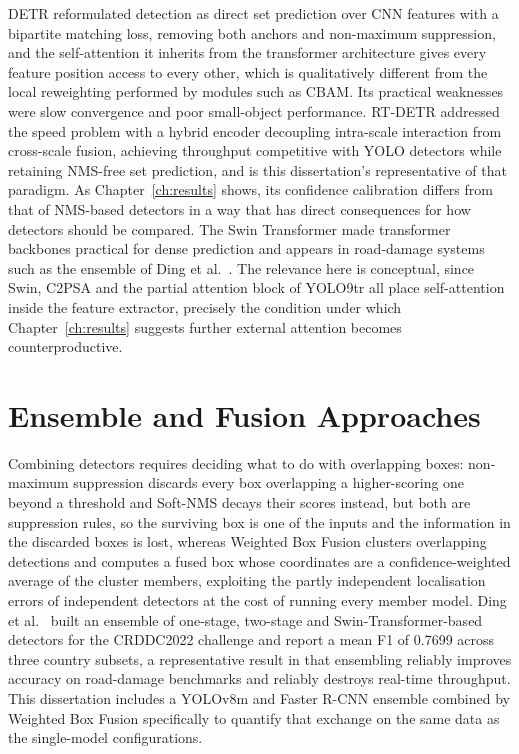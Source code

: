 \documentclass[MScCS]{uccthesis}
\begin{document}
DETR \parencite{carion2020detr} reformulated detection as direct set prediction
over CNN features with a bipartite matching loss, removing both anchors and
non-maximum suppression, and the self-attention it inherits from the transformer
architecture \parencite{vaswani2017attention} gives every feature position
access to every other, which is qualitatively different from the local
reweighting performed by modules such as CBAM. Its practical weaknesses were
slow convergence and poor small-object performance. RT-DETR
\parencite{zhao2024rtdetr} addressed the speed problem with a hybrid encoder
decoupling intra-scale interaction from cross-scale fusion, achieving throughput
competitive with YOLO detectors while retaining NMS-free set prediction, and is
this dissertation's representative of that paradigm. As Chapter~\ref{ch:results}
shows, its confidence calibration differs from that of NMS-based detectors in a
way that has direct consequences for how detectors should be compared. The Swin
Transformer \parencite{liu2021swin} made transformer backbones practical for
dense prediction and appears in road-damage systems such as the ensemble of Ding
et al.~\parencite{ding2022ensemble}. The relevance here is conceptual, since
Swin, C2PSA and the partial attention block of YOLO9tr all place self-attention
inside the feature extractor, precisely the condition under which
Chapter~\ref{ch:results} suggests further external attention becomes
counterproductive.


\section{Ensemble and Fusion Approaches}
\label{sec:ensembles_related}

Combining detectors requires deciding what to do with overlapping boxes:
non-maximum suppression discards every box overlapping a higher-scoring one
beyond a threshold and Soft-NMS \parencite{bodla2017soft} decays their scores
instead, but both are suppression rules, so the surviving box is one of the
inputs and the information in the discarded boxes is lost, whereas Weighted Box
Fusion \parencite{solovyev2021weighted} clusters overlapping detections and
computes a fused box whose coordinates are a confidence-weighted average of the
cluster members, exploiting the partly independent localisation errors of
independent detectors at the cost of running every member model. Ding et
al.~\parencite{ding2022ensemble} built an ensemble of one-stage, two-stage and
Swin-Transformer-based detectors for the CRDDC2022 challenge and report a mean
F1 of 0.7699 across three country subsets, a representative result in that
ensembling reliably improves accuracy on road-damage benchmarks and reliably
destroys real-time throughput. This dissertation includes a YOLOv8m and Faster
R-CNN ensemble combined by Weighted Box Fusion specifically to quantify that
exchange on the same data as the single-model configurations.
\end{document}
